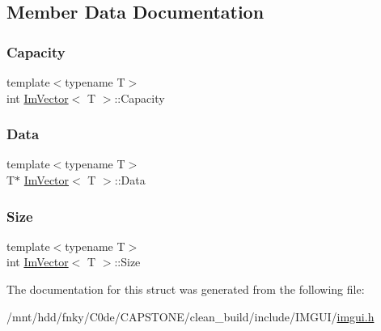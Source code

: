 \subsection{Member Data Documentation}
\mbox{\label{structImVector_abd24482b4d30d22e37582e521e5bfb33}} 
\subsubsection{\texorpdfstring{Capacity}{Capacity}}
{\footnotesize\ttfamily template$<$typename T$>$ \\
int \hyperlink{structImVector}{Im\+Vector}$<$ T $>$\+::Capacity}

\mbox{\label{structImVector_ac0e46e8b30cb079d93c8f0aad7d7cbd0}} 
\subsubsection{\texorpdfstring{Data}{Data}}
{\footnotesize\ttfamily template$<$typename T$>$ \\
T$\ast$ \hyperlink{structImVector}{Im\+Vector}$<$ T $>$\+::Data}

\mbox{\label{structImVector_abbfd157947f66280d27b21d70a16df8d}} 
\subsubsection{\texorpdfstring{Size}{Size}}
{\footnotesize\ttfamily template$<$typename T$>$ \\
int \hyperlink{structImVector}{Im\+Vector}$<$ T $>$\+::Size}



The documentation for this struct was generated from the following file\+:\begin{DoxyCompactItemize}
\item 
/mnt/hdd/fnky/\+C0de/\+C\+A\+P\+S\+T\+O\+N\+E/clean\+\_\+build/include/\+I\+M\+G\+U\+I/\hyperlink{imgui_8h}{imgui.\+h}\end{DoxyCompactItemize}
